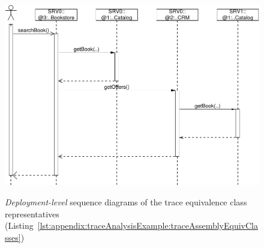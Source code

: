 \begin{figure}[h]
{\includegraphics[scale=0.39]{images/example-plots/deploymentSequenceDiagram-6488138950668976131-crop}
}
\caption{\textit{Deployment-level} sequence diagrams of the trace %
equivalence class representatives (Listing~\ref{lst:appendix:traceAnalysisExample:traceAssemblyEquivClasses})}
\label{fig:appendix:traceAnalysisExample:SeqDiagrsDepl}
\end{figure}

